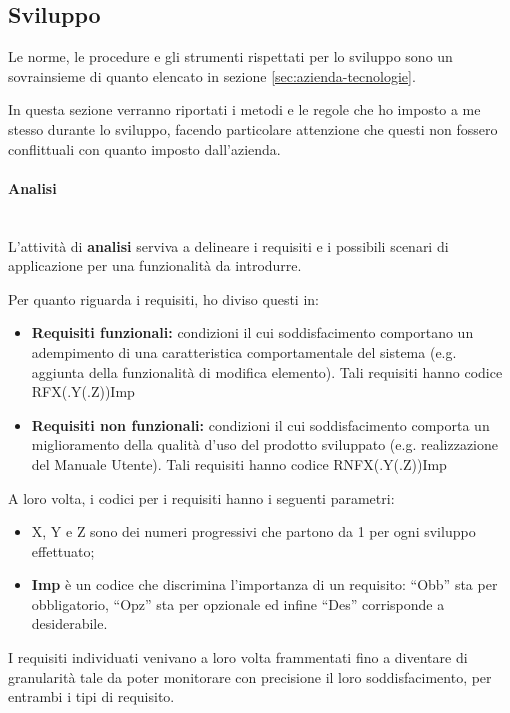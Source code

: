 \subsection{Sviluppo}

Le norme, le procedure e gli strumenti rispettati per lo sviluppo sono un
sovrainsieme di quanto elencato in sezione \ref{sec:azienda-tecnologie}.

In questa sezione verranno riportati i metodi e le regole che ho imposto a me
stesso durante lo sviluppo, facendo particolare attenzione che questi non
fossero conflittuali con quanto imposto dall'azienda.

\paragraph{Analisi} \mbox{} \\

L'attività di \textbf{analisi} serviva a delineare i requisiti e i possibili
scenari di applicazione per una funzionalità da introdurre.

Per quanto riguarda i requisiti, ho diviso questi in:

\begin{itemize}
\item \textbf{Requisiti funzionali:} condizioni il cui soddisfacimento
  comportano un adempimento di una caratteristica comportamentale del sistema
  (e.g. aggiunta della funzionalità di modifica elemento). Tali requisiti hanno codice RFX(.Y(.Z))Imp
\item \textbf{Requisiti non funzionali:} condizioni il cui soddisfacimento
  comporta un miglioramento della qualità d'uso del prodotto sviluppato (e.g.
  realizzazione del Manuale Utente). Tali requisiti hanno codice
  RNFX(.Y(.Z))Imp
\end{itemize}

A loro volta, i codici per i requisiti hanno i seguenti parametri:

\begin{itemize}
\item X, Y e Z sono dei numeri progressivi che partono da 1 per ogni sviluppo
  effettuato;
\item \textbf{Imp} è un codice che discrimina l'importanza di un requisito:
  ``Obb'' sta per obbligatorio, ``Opz'' sta per opzionale ed infine ``Des''
  corrisponde a desiderabile.
\end{itemize}

I requisiti individuati venivano a loro volta frammentati fino a diventare di
granularità tale da poter monitorare con precisione il loro soddisfacimento,
per entrambi i tipi di requisito.

